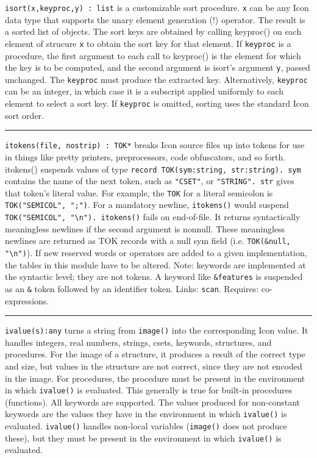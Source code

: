 \texttt{i}\texttt{sort}\texttt{(x,keyproc,y) : list} is a
customizable sort procedure. \texttt{x} can be any Icon data type that
supports the unary element generation (!) operator. The result is a
sorted list of objects. The sort keys are obtained by calling
keyproc() on each element of strucure \texttt{x} to obtain the sort
key for that element. If
\texttt{keyproc} is a procedure, the first argument to each call to
keyproc() is the element for which the key is to be computed,
and the second argument is isort's argument
\texttt{y}, passed unchanged. The \texttt{keyproc} must produce the
extracted key. Alternatively, \texttt{keyproc} can be an integer, in
which case it is a subscript applied uniformly to each element to select
a sort key. If \texttt{keyproc} is omitted, sorting uses
the standard Icon sort order.

\vspace{0.25cm}\hrule{}

\texttt{itokens(file, nostrip) : TOK*} breaks Icon source files up into
tokens for use in things like pretty printers, preprocessors, code
obfuscators, and so forth. itokens() suspends values of type
\texttt{record TOK(sym:string, str:string). sym} contains the name of
the next token, such as \texttt{"CSET"}, or
\texttt{"STRING". str} gives that
token's literal value. For example, the \texttt{TOK}
for a literal semicolon is
\texttt{TOK("SEMICOL",
";")}. For a mandatory newline,
\texttt{itokens()} would suspend
\texttt{TOK("SEMICOL",
"{\textbackslash}n"). itokens()} fails on
end-of-file. It returns syntactically meaningless newlines if the
second argument is nonnull. These meaningless newlines are returned as
TOK records with a null sym field (i.e. \texttt{TOK(\&null,
"{\textbackslash}n")}). If new reserved
words or operators are added to a given implementation, the tables in
this module have to be altered. Note: keywords are implemented at the
syntactic level; they are not tokens. A keyword like
\texttt{\&features} is suspended as an \texttt{\&} token followed by an
identifier token.
Links: \texttt{scan}. Requires: co-expressions.

\vspace{0.25cm}\hrule{}

\texttt{ivalue(s):any} turns a string from \texttt{image()} into the
corresponding Icon value. It handles integers, real numbers,
strings, csets, keywords, structures, and procedures. For the image of
a structure, it produces a result of the correct type and size, but
values in the structure are not correct, since they are not encoded in
the image. For procedures, the procedure must be present in the
environment in which \texttt{ivalue()} is evaluated. This generally is
true for built-in procedures (functions). All keywords are supported.
The values produced for non-constant keywords are the
values they have in the environment in which \texttt{ivalue()} is
evaluated. \texttt{ivalue()} handles non-local variables
(\texttt{image()} does not produce these), but they must be present in
the environment in which \texttt{ivalue()} is evaluated. 

